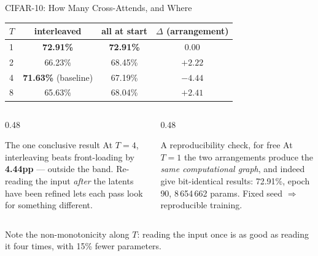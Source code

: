 \documentclass[aspectratio=169,11pt]{beamer}
\begin{document}
\begin{frame}[shrink=5]{CIFAR-10: How Many Cross-Attends, and Where}
  \begin{table}
    \centering\small
    \begin{tabular}{lccc}
      \toprule
      \textbf{$T$} & \textbf{interleaved} & \textbf{all at start} & \textbf{$\Delta$ (arrangement)} \\
      \midrule
      1 & \textbf{72.91\%} & \textbf{72.91\%} & $0.00$ \\
      2 & 66.23\% & 68.45\% & $+2.22$ \\
      4 & \textbf{71.63\%} \tiny(baseline) & 67.19\% & \textcolor{AccentRed}{$\mathbf{-4.44}$} \\
      8 & 65.63\% & 68.04\% & $+2.41$ \\
      \bottomrule
    \end{tabular}
  \end{table}

  \vspace{0.3em}
  \begin{columns}[T]
    \begin{column}{0.48\textwidth}
      \begin{block}{The one conclusive result}
        \small
        At $T=4$, interleaving beats front-loading by \textbf{4.44pp} --- outside the band. Re-reading the input \emph{after} the latents have been refined lets each pass look for something different.
      \end{block}
    \end{column}
    \begin{column}{0.48\textwidth}
      \begin{block}{A reproducibility check, for free}
        \small
        At $T=1$ the two arrangements produce the \emph{same computational graph}, and indeed give bit-identical results: 72.91\%, epoch 90, 8\,654\,662 params. Fixed seed $\Rightarrow$ reproducible training.
      \end{block}
    \end{column}
  \end{columns}

  \vspace{0.2em}
  \scriptsize Note the non-monotonicity along $T$: reading the input once is as good as reading it four times, with 15\% fewer parameters.
\end{frame}
\end{document}
